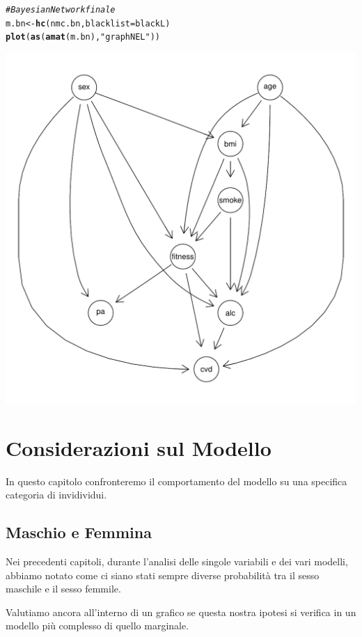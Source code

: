\documentclass{article}\usepackage[]{graphicx}\usepackage[]{xcolor}
\makeatletter
\def\maxwidth{ %
  \ifdim\Gin@nat@width>\linewidth
    \linewidth
  \else
    \Gin@nat@width
  \fi
}
\newcommand{\hlstr}[1]{\textcolor[rgb]{0.192,0.494,0.8}{#1}}%
\newcommand{\hlcom}[1]{\textcolor[rgb]{0.678,0.584,0.686}{\textit{#1}}}%
\newcommand{\hlstd}[1]{\textcolor[rgb]{0.345,0.345,0.345}{#1}}%
\newcommand{\hlkwb}[1]{\textcolor[rgb]{0.69,0.353,0.396}{#1}}%
\newcommand{\hlkwc}[1]{\textcolor[rgb]{0.333,0.667,0.333}{#1}}%
\newcommand{\hlkwd}[1]{\textcolor[rgb]{0.737,0.353,0.396}{\textbf{#1}}}%
\newenvironment{kframe}{%
 \def\at@end@of@kframe{}%
 \ifinner\ifhmode%
  \def\at@end@of@kframe{\end{minipage}}%
  \begin{minipage}{\columnwidth}%
 \fi\fi%
 \def\FrameCommand##1{\hskip\@totalleftmargin \hskip-\fboxsep
 \colorbox{shadecolor}{##1}\hskip-\fboxsep
     \hskip-\linewidth \hskip-\@totalleftmargin \hskip\columnwidth}%
 \MakeFramed {\advance\hsize-\width
   \@totalleftmargin\z@ \linewidth\hsize
   \@setminipage}}%
 {\par\unskip\endMakeFramed%
 \at@end@of@kframe}
\newenvironment{knitrout}{}{} %
\makeatother
\begin{document}
      
\begin{knitrout}
\color{fgcolor}\begin{kframe}
\begin{alltt}
\hlcom{#Bayesian Network finale}
\hlstd{m.bn} \hlkwb{<-} \hlkwd{hc}\hlstd{(nmc.bn,} \hlkwc{blacklist}\hlstd{=blackL)}
\hlkwd{plot}\hlstd{(}\hlkwd{as}\hlstd{(}\hlkwd{amat}\hlstd{(m.bn),} \hlstr{"graphNEL"}\hlstd{))}
\end{alltt}
\end{kframe}
\includegraphics[width=\maxwidth]{figure/Bayesian_Network_finale-1} 
\end{knitrout}
      
    
  \clearpage


\section{Considerazioni sul Modello}
  In questo capitolo confronteremo il comportamento del modello su una specifica      categoria di invidividui.

  \subsection{Maschio e Femmina} 
    Nei precedenti capitoli, durante l'analisi delle singole variabili e dei vari 
    modelli, abbiamo notato come ci siano stati sempre diverse probabilità 
    tra il sesso maschile e il sesso femmile.\par
    Valutiamo ancora all'interno di un grafico se questa nostra ipotesi si 
    verifica in un modello più complesso di quello marginale.
      
\end{document}
